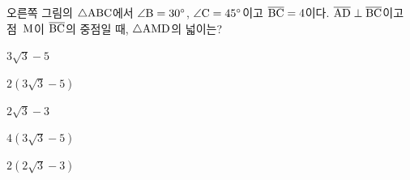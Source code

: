 \noindent\begin{minipage}[t]{0.58\linewidth}\vspace{0pt}\raggedright 오른쪽 그림의 $\triangle\mathrm{ABC}$에서 $\angle\mathrm{B}=30^\circ$, $\angle\mathrm{C}=45^\circ$이고 $\overline{\mathrm{BC}}=4$이다. $\overline{\mathrm{AD}}\perp\overline{\mathrm{BC}}$이고 점~$\mathrm{M}$이 $\overline{\mathrm{BC}}$의 중점일 때, $\triangle\mathrm{AMD}$의 넓이는?\end{minipage}\hfill\begin{minipage}[t]{0.4\linewidth}\vspace{0pt}\centering \resizebox{\ifdim\width>\linewidth\linewidth\else\width\fi}{!}{}\end{minipage}\par
\begin{choices32}{\rule[-3ex]{0pt}{8ex}$3\sqrt{3}-5$}{\rule[-3ex]{0pt}{8ex}$2(3\sqrt{3}-5)$}{\rule[-3ex]{0pt}{8ex}$2\sqrt{3}-3$}{\rule[-3ex]{0pt}{8ex}$4(3\sqrt{3}-5)$}{\rule[-3ex]{0pt}{8ex}$2(2\sqrt{3}-3)$}\end{choices32}
